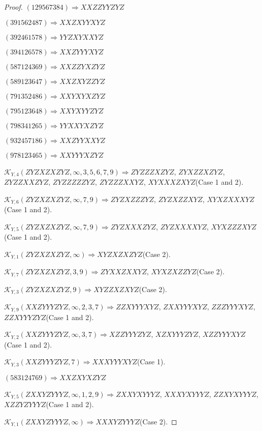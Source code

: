 \documentclass[12pt]{article}
\theoremstyle{plain}
\theoremstyle{definition}
\theoremstyle{remark}
\newcommand{\fancy}[1]{\mathcal{#1}}
\def\K{\fancy{K}}
\begin{document}
\begin{proof}
	$(1 2 9 5 6 7 3 8 4)\Rightarrow XXZZYYZYZ$
	
	$(3 9 1 5 6 2 4 8 7)\Rightarrow XXZXYYXYZ$
	
	$(3 9 2 4 6 1 5 7 8)\Rightarrow YYZXYXXYZ$
	
	$(3 9 4 1 2 6 5 7 8)\Rightarrow XXZYYYXYZ$
	
	$(5 8 7 1 2 4 3 6 9)\Rightarrow XXZZYXZYZ$
	
	$(5 8 9 1 2 3 6 4 7)\Rightarrow XXZXYZZYZ$
	
	$(7 9 1 3 5 2 4 8 6)\Rightarrow XXYXYXZYZ$
	
	$(7 9 5 1 2 3 6 4 8)\Rightarrow XXYXYYZYZ$
	
	$(7 9 8 3 4 1 2 6 5)\Rightarrow YYXXYXZYZ$
	
	$(9 3 2 4 5 7 1 8 6)\Rightarrow XXZYYXXYZ$
	
	$(9 7 8 1 2 3 4 6 5)\Rightarrow XXYYYXZYZ$
	
	
	
	$\K_{Y,4}(ZYZXZXZYZ,\infty,3, 5, 6, 7, 9)\Rightarrow $$ZYZZZXZYZ$, $ZYXZZXZYZ$, $ZYZZXXZYZ$, $ZYZZZZZYZ$, $ZYZZZXXYZ$, $XYXXXZXYZ$(Case 1 and 2).
	
	$\K_{Y,6}(ZYZXZXZYZ,\infty,7, 9)\Rightarrow $$ZYZXZZZYZ$, $ZYZXZZXYZ$, $XYXZXXXYZ$(Case 1 and 2).
	
	$\K_{Y,5}(ZYZXZXZYZ,\infty,7, 9)\Rightarrow $$ZYZXXXZYZ$, $ZYZXXXXYZ$, $XYXZZZXYZ$(Case 1 and 2).
	
	$\K_{Y,1}(ZYZXZXZYZ,\infty)\Rightarrow $$XYZXZXZYZ$(Case 2).
	
	$\K_{Y,7}(ZYZXZXZYZ,3, 9)\Rightarrow $$ZYXXZXXYZ$, $XYXZXZZYZ$(Case 2).
	
	$\K_{Y,3}(ZYZXZXZYZ,9)\Rightarrow $$XYZZXZXYZ$(Case 2).
	
	$\K_{Y,9}(XXZYYYZYZ,\infty,2, 3, 7)\Rightarrow $$ZZXYYYXYZ$, $ZXXYYYXYZ$, $ZZZYYYXYZ$, $ZZXYYYZYZ$(Case 1 and 2).
	
	$\K_{Y,2}(XXZYYYZYZ,\infty,3, 7)\Rightarrow $$XZZYYYZYZ$, $XZXYYYZYZ$, $XZZYYYXYZ$(Case 1 and 2).
	
	$\K_{Y,3}(XXZYYYZYZ,7)\Rightarrow $$XXXYYYXYZ$(Case 1).
	
	
	
	$(5 8 3 1 2 4 7 6 9)\Rightarrow XXZXYXZYZ$
	
	
	
	$\K_{Y,5}(ZXXYZYYYZ,\infty,1, 2, 9)\Rightarrow $$ZXXYXYYYZ$, $XXXYXYYYZ$, $ZZXYXYYYZ$, $XZZYZYYYZ$(Case 1 and 2).
	
	$\K_{Y,1}(ZXXYZYYYZ,\infty)\Rightarrow $$XXXYZYYYZ$(Case 2).
	

\end{proof}
\end{document}
